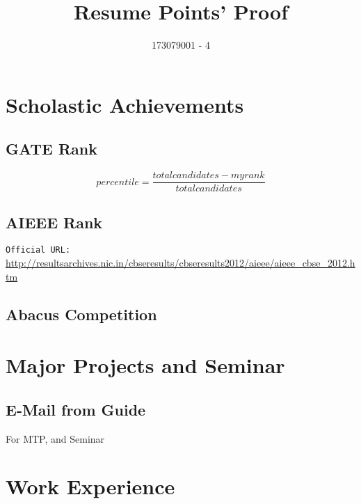 \documentclass{article}
\title{Resume Points' Proof}
\author{173079001 - 4}
\date{}
\begin{document}
\maketitle
\tableofcontents
\newpage
\section{Scholastic Achievements}
	\subsection{GATE Rank}
		$$percentile = \frac{total candidates - myrank }{total candidates}$$
		\begin{figure}[h]
		\end{figure}

\newpage
	\subsection{AIEEE Rank}
		\texttt{Official URL:} \url{http://resultsarchives.nic.in/cbseresults/cbseresults2012/aieee/aieee_cbse_2012.htm}
		\begin{figure}[h]
		\end{figure}
		
\newpage
	\subsection{Abacus Competition}
		\begin{figure}[h]
		\end{figure}
\newpage
\section{Major Projects and Seminar}
	\subsection{E-Mail from Guide}
		For MTP, and Seminar
		\begin{figure}[h]
		\end{figure}
\newpage
\section{Work Experience}
\end{document}
